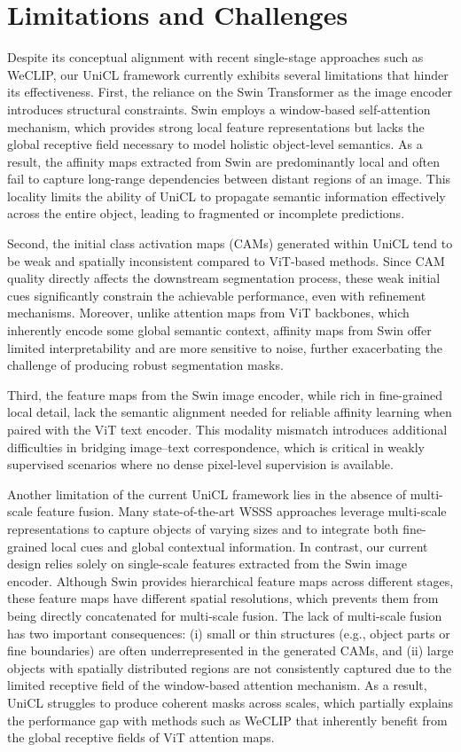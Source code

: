 \section{Limitations and Challenges}
\label{sec:limitations_and_challenges}
Despite its conceptual alignment with recent single-stage approaches such as WeCLIP, our UniCL framework currently exhibits several limitations that hinder its effectiveness. First, the reliance on the Swin Transformer as the image encoder introduces structural constraints. Swin employs a window-based self-attention mechanism, which provides strong local feature representations but lacks the global receptive field necessary to model holistic object-level semantics. As a result, the affinity maps extracted from Swin are predominantly local and often fail to capture long-range dependencies between distant regions of an image. This locality limits the ability of UniCL to propagate semantic information effectively across the entire object, leading to fragmented or incomplete predictions.  

Second, the initial class activation maps (CAMs) generated within UniCL tend to be weak and spatially inconsistent compared to ViT-based methods. Since CAM quality directly affects the downstream segmentation process, these weak initial cues significantly constrain the achievable performance, even with refinement mechanisms. Moreover, unlike attention maps from ViT backbones, which inherently encode some global semantic context, affinity maps from Swin offer limited interpretability and are more sensitive to noise, further exacerbating the challenge of producing robust segmentation masks.  

Third, the feature maps from the Swin image encoder, while rich in fine-grained local detail, lack the semantic alignment needed for reliable affinity learning when paired with the ViT text encoder. This modality mismatch introduces additional difficulties in bridging image–text correspondence, which is critical in weakly supervised scenarios where no dense pixel-level supervision is available.  

Another limitation of the current UniCL framework lies in the absence of multi-scale feature fusion. Many state-of-the-art WSSS approaches leverage multi-scale representations to capture objects of varying sizes and to integrate both fine-grained local cues and global contextual information. In contrast, our current design relies solely on single-scale features extracted from the Swin image encoder. Although Swin provides hierarchical feature maps across different stages, these feature maps have different spatial resolutions, which prevents them from being directly concatenated for multi-scale fusion. The lack of multi-scale fusion has two important consequences: (i) small or thin structures (e.g., object parts or fine boundaries) are often underrepresented in the generated CAMs, and (ii) large objects with spatially distributed regions are not consistently captured due to the limited receptive field of the window-based attention mechanism. As a result, UniCL struggles to produce coherent masks across scales, which partially explains the performance gap with methods such as WeCLIP that inherently benefit from the global receptive fields of ViT attention maps.
 

